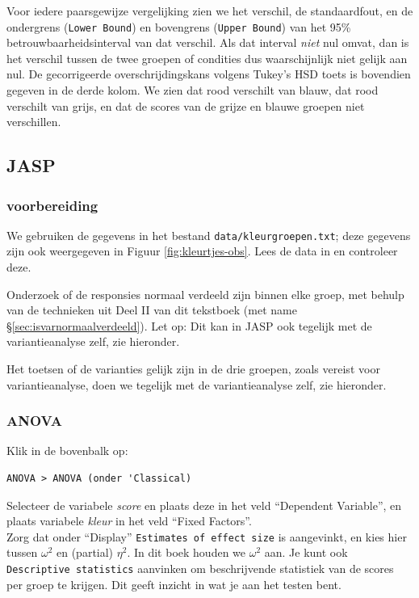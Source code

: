 \documentclass[
]{book}
\begin{document}
Voor iedere paarsgewijze vergelijking zien we het verschil, de
standaardfout, en de ondergrens (\texttt{Lower\ Bound}) en bovengrens
(\texttt{Upper\ Bound}) van het 95\% betrouwbaarheidsinterval van dat verschil.
Als dat interval \emph{niet} nul omvat, dan is het verschil tussen de twee
groepen of condities dus waarschijnlijk niet gelijk aan nul. De
gecorrigeerde overschrijdingskans volgens Tukey's HSD toets is bovendien
gegeven in de derde kolom. We zien dat rood verschilt van blauw, dat
rood verschilt van grijs, en dat de scores van de grijze en blauwe
groepen niet verschillen.

\hypertarget{jasp-14}{%
\subsection{JASP}\label{jasp-14}}

\hypertarget{voorbereiding-2}{%
\subsubsection{voorbereiding}\label{voorbereiding-2}}

We gebruiken de gegevens in het bestand \texttt{data/kleurgroepen.txt}; deze gegevens zijn ook weergegeven in Figuur \ref{fig:kleurtjes-obs}.
Lees de data in en controleer deze.

Onderzoek of de responsies normaal verdeeld zijn binnen elke groep, met behulp van de
technieken uit Deel II van dit tekstboek (met name
§\ref{sec:isvarnormaalverdeeld}). Let op: Dit kan in JASP ook tegelijk met de variantieanalyse zelf, zie hieronder.

Het toetsen of de varianties gelijk zijn in de
drie groepen, zoals vereist voor variantieanalyse, doen we tegelijk
met de variantieanalyse zelf, zie hieronder.

\hypertarget{anova-1}{%
\subsubsection{ANOVA}\label{anova-1}}

Klik in de bovenbalk op:

\begin{verbatim}
ANOVA > ANOVA (onder 'Classical)
\end{verbatim}

Selecteer de variabele \emph{score} en plaats deze in het veld ``Dependent Variable'', en plaats variabele \emph{kleur} in het veld ``Fixed Factors''.\\
Zorg dat onder ``Display'' \texttt{Estimates\ of\ effect\ size} is aangevinkt, en kies hier tussen \(\omega^2\) en (partial) \(\eta^2\). In dit boek houden we \(\omega^2\) aan. Je kunt ook \texttt{Descriptive\ statistics} aanvinken om beschrijvende statistiek van de scores per groep te krijgen. Dit geeft inzicht in wat je aan het testen bent.
\end{document}
